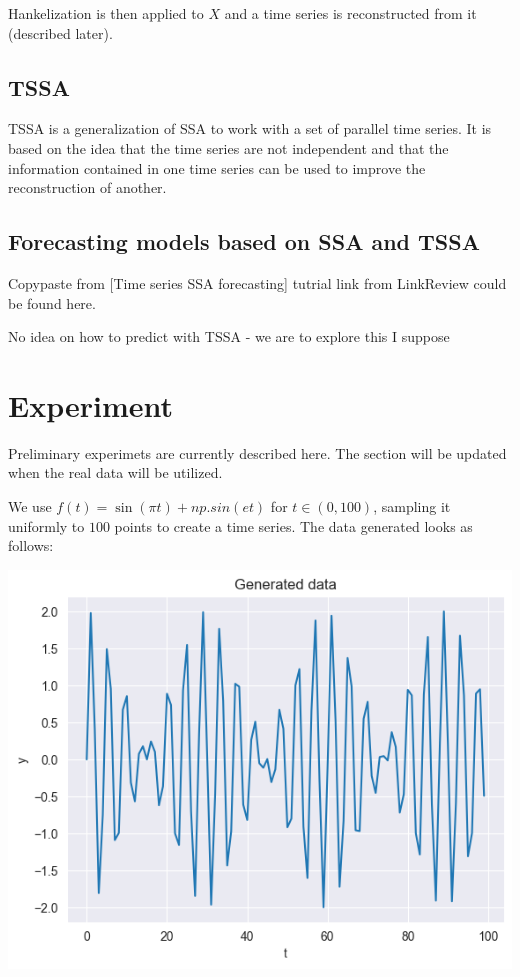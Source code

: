 \documentclass{article}
\begin{document}
Hankelization is then applied to \(X\) and a time series is reconstructed from it (described later).

\subsection{TSSA}

TSSA is a generalization of SSA to work with a set of parallel time series. It is based on the idea that the time series are not independent and that the information contained in one time series can be used to improve the reconstruction of another.

\subsection{Forecasting models based on SSA and TSSA}

Copypaste from [Time series SSA forecasting] tutrial link from LinkReview could be found here.

No idea on how to predict with TSSA - we are to explore this I suppose

\section{Experiment}

Preliminary experimets are currently described here. The section will be updated when the real data will be utilized.

We use \(f(t) = \sin(\pi t) + np.sin(et)\) for \(t \in (0, 100)\), sampling it uniformly to \(100\) points to create a time series. The data generated looks as follows:

\includegraphics[scale=0.7]{./images/fig1.png}
\end{document}
